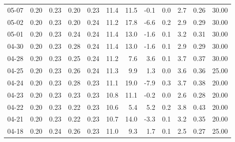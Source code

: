 \begin{threeparttable}
{\begin{tabular}{lrrrrrrrrrrr}
  05-07 &          0.20 &          0.23 &          0.20 &        0.23 &                11.4 &                11.5 &       -0.1 &                 0.0 &              2.7 &            0.26 &                  30.00 \\
  05-02 &          0.20 &          0.23 &          0.20 &        0.24 &                11.2 &                17.8 &       -6.6 &                 0.2 &              2.9 &            0.29 &                  30.00 \\
  05-01 &          0.20 &          0.23 &          0.24 &        0.24 &                11.4 &                13.0 &       -1.6 &                 0.1 &              3.2 &            0.31 &                  30.00 \\
  04-30 &          0.20 &          0.23 &          0.28 &        0.24 &                11.4 &                13.0 &       -1.6 &                 0.1 &              2.9 &            0.29 &                  30.00 \\
  04-28 &          0.20 &          0.23 &          0.25 &        0.24 &                11.2 &                 7.6 &        3.6 &                 0.1 &              3.7 &            0.37 &                  30.00 \\
  04-25 &          0.20 &          0.23 &          0.26 &        0.24 &                11.3 &                 9.9 &        1.3 &                 0.0 &              3.6 &            0.36 &                  25.00 \\
  04-24 &          0.20 &          0.23 &          0.28 &        0.23 &                11.1 &                19.0 &       -7.9 &                 0.3 &              3.7 &            0.38 &                  20.00 \\
  04-23 &          0.20 &          0.23 &          0.23 &        0.23 &                10.8 &                11.1 &       -0.2 &                 0.0 &              2.6 &            0.28 &                  20.00 \\
  04-22 &          0.20 &          0.23 &          0.22 &        0.23 &                10.6 &                 5.4 &        5.2 &                 0.2 &              3.8 &            0.43 &                  20.00 \\
  04-21 &          0.20 &          0.23 &          0.22 &        0.23 &                10.7 &                14.0 &       -3.3 &                 0.1 &              3.2 &            0.35 &                  20.00 \\
  04-18 &          0.20 &          0.24 &          0.26 &        0.23 &                11.0 &                 9.3 &        1.7 &                 0.1 &              2.5 &            0.27 &                  25.00 \\

\end{tabular}}
\end{threeparttable}
